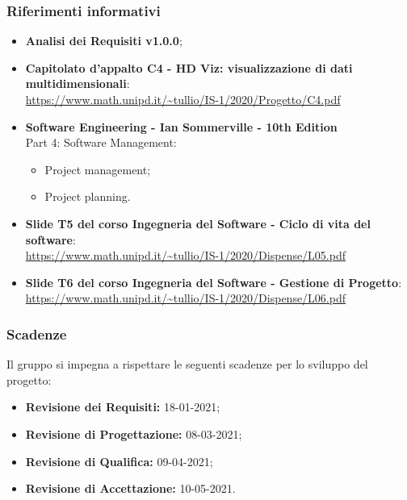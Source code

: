 \subsubsection{Riferimenti informativi}
\begin{itemize}
	\item \textbf{Analisi dei Requisiti v1.0.0};
	
	\item \textbf{Capitolato d'appalto C4 - HD Viz: visualizzazione di dati multidimensionali}:\\
	\textcolor{blue}{\url{https://www.math.unipd.it/~tullio/IS-1/2020/Progetto/C4.pdf}}
	
	\item \textbf{Software Engineering - Ian Sommerville - 10th Edition}\\ Part 4: Software Management:
	\begin{itemize}
	\item Project management;
	\item Project planning.
	\end{itemize}		 
	
	\item \textbf{Slide T5 del corso Ingegneria del Software - Ciclo di vita del software}:\\
	\textcolor{blue}{\url{https://www.math.unipd.it/~tullio/IS-1/2020/Dispense/L05.pdf}}
	
	\item \textbf{Slide T6 del corso Ingegneria del Software - Gestione di Progetto}:\\
	\textcolor{blue}{\url{https://www.math.unipd.it/~tullio/IS-1/2020/Dispense/L06.pdf}}
\end{itemize}

\subsubsection{Scadenze}
Il gruppo \Gruppo{} si impegna a rispettare le seguenti scadenze per lo sviluppo del progetto:
\begin{itemize}
\item \textbf{Revisione dei Requisiti:} 18-01-2021;
\item \textbf{Revisione di Progettazione:} 08-03-2021;
\item \textbf{Revisione di Qualifica:} 09-04-2021;
\item \textbf{Revisione di Accettazione:} 10-05-2021.
\end{itemize}

